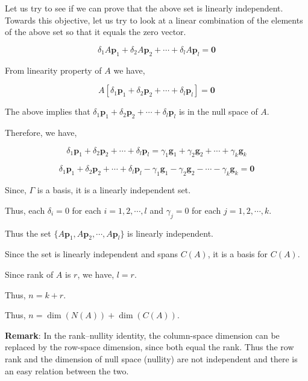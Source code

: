 \documentclass[a4paper]{article}
\begin{document}
Let us try to see if we can prove that the above set is linearly independent. Towards this objective, let us try to look at a linear combination of the elements of the above set so that it equals the zero vector.

\begin{equation}
\delta_1 A\boldsymbol{p}_1 + \delta_2 A\boldsymbol{p}_2 + \cdots + \delta_l A\boldsymbol{p}_l = \boldsymbol{0}
\end{equation}

From linearity property of $A$ we have,

\begin{equation}
A\left[\delta_1 \boldsymbol{p}_1 + \delta_2 \boldsymbol{p}_2 + \cdots + \delta_l \boldsymbol{p}_l \right]= \boldsymbol{0}
\end{equation}

The above implies that $\delta_1 \boldsymbol{p}_1 + \delta_2 \boldsymbol{p}_2 + \cdots + \delta_l \boldsymbol{p}_l$ is in the null space of $A$.

Therefore, we have,

\begin{equation}
\delta_1 \boldsymbol{p}_1 + \delta_2 \boldsymbol{p}_2 + \cdots + \delta_l \boldsymbol{p}_l = \gamma_1 \boldsymbol{g}_1 + \gamma_2 \boldsymbol{g}_2 + \cdots + \gamma_k \boldsymbol{g}_k
\end{equation}

\begin{equation}
\delta_1 \boldsymbol{p}_1 + \delta_2 \boldsymbol{p}_2 + \cdots + \delta_l \boldsymbol{p}_l - \gamma_1 \boldsymbol{g}_1 - \gamma_2 \boldsymbol{g}_2 - \cdots - \gamma_k \boldsymbol{g}_k = \boldsymbol{0}
\end{equation}

Since, $\Gamma$ is a basis, it is a linearly independent set.

Thus, each $\delta_i = 0$ for each $i=1,2, \cdots,l$ and $\gamma_j = 0$ for each $j = 1,2, \cdots, k$. 

Thus the set $\{ A\boldsymbol{p}_1, A\boldsymbol{p}_2, \cdots, A\boldsymbol{p}_l \}$ is linearly independent.

\bigskip

Since the set is linearly independent and spans $C(A)$, it is a basis for $C(A)$.

Since rank of $A$ is $r$, we have, $l = r$.

Thus, $ n = k + r$.

Thus, $n = \dim(N(A)) + \dim(C(A))$.

\bigskip

\textbf{Remark}:
In the rank–nullity identity, the column-space dimension can be replaced by the row-space dimension, since both equal the rank. Thus the row rank and the dimension of null space (nullity) are not independent and there is an easy relation between the two.
\end{document}
